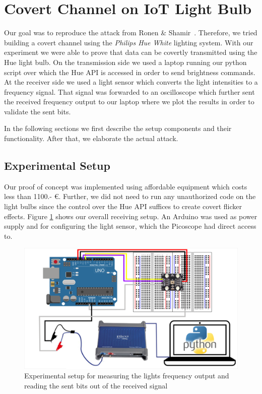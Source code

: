 \section{Covert Channel on IoT Light Bulb} %
\label{sec:experiment}
Our goal was to reproduce the attack from Ronen \& Shamir~\cite{Ronen:2016:EFAIDCSL}.
Therefore, we tried building a covert channel using the \textit{Philips Hue White} lighting system. With our experiment we were able to prove that data can be covertly transmitted using the Hue light bulb. 
On the transmission side we used a laptop running our python script over which the Hue API is accessed in order to send brightness commands.
At the receiver side we used a light sensor which converts the light intensities to a frequency signal. That signal was forwarded to an oscilloscope which further sent the received frequency output to our laptop where we plot the results in order to validate the sent bits.

In the following sections we first describe the setup components and their functionality. After that, we elaborate the actual attack.\newline

\subsection{Experimental Setup} %
\label{sec:setup}


Our proof of concept was implemented using affordable equipment which costs less than 1100.- €. Further, we did not need to run any unauthorized code on the light bulbs since the control over the Hue API suffices to create covert flicker effects. 
Figure \ref{fig:setup} shows our overall receiving setup. An Arduino was used as power supply and for configuring the light sensor, which the Picoscope had direct access to.
\begin{figure}[h]
	\centering
	\includegraphics[width=14cm]{img/experimental-setup_overview.png}
	\caption{Experimental setup for measuring the lights frequency output and reading the sent bits out of the received signal}
	\label{fig:setup}
\end{figure}

